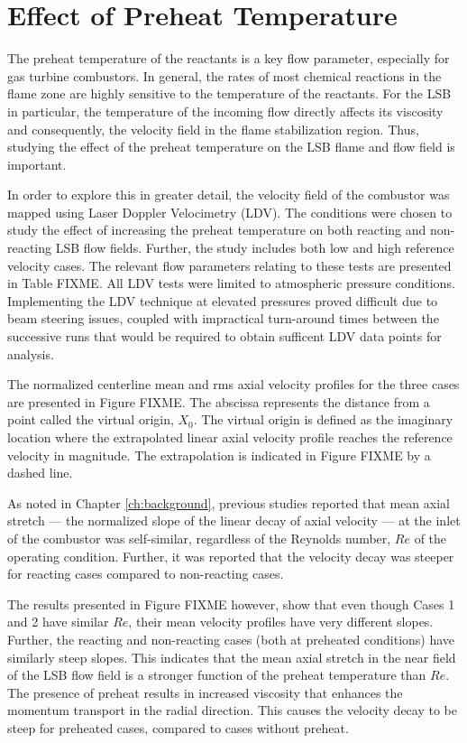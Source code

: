 \section{Effect of Preheat Temperature}
\label{sec:lsb-effect-of-preheat-temperature}

The preheat temperature of the reactants is a key flow parameter, especially for gas turbine combustors.
In general, the rates of most chemical reactions in the flame zone are highly sensitive to the temperature of the reactants.
For the LSB in particular, the temperature of the incoming flow directly affects its viscosity and consequently, the velocity field in the flame stabilization region.
Thus, studying the effect of the preheat temperature on the LSB flame and flow field is important.

In order to explore this in greater detail, the velocity field of the combustor was mapped using Laser Doppler Velocimetry (LDV).
The conditions were chosen to study the effect of increasing the preheat temperature on both reacting and non-reacting LSB flow fields.
Further, the study includes both low and high reference velocity cases.
The relevant flow parameters relating to these tests are presented in Table FIXME.
All LDV tests were limited to atmospheric pressure conditions.
Implementing the LDV technique at elevated pressures proved difficult due to beam steering issues, coupled with impractical turn-around times between the successive runs that would be required to obtain sufficent LDV data points for analysis.

The normalized centerline mean and rms axial velocity profiles for the three cases are presented in Figure FIXME.
The abscissa represents the distance from a point called the virtual origin, \(X_0\).
The virtual origin is defined as the imaginary location where the extrapolated linear axial velocity profile reaches the reference velocity in magnitude.
The extrapolation is indicated in Figure FIXME by a dashed line.

As noted in Chapter \ref{ch:background}, previous studies\cite{2008-cheng-a} reported that mean axial stretch --- the normalized slope of the linear decay of axial velocity --- at the inlet of the combustor was self-similar, regardless of the Reynolds number, \(Re\) of the operating condition.
Further, it was reported that the velocity decay was steeper for reacting cases compared to non-reacting cases.

The results presented in Figure FIXME however, show that even though Cases 1 and 2 have similar \(Re\), their mean velocity profiles have very different slopes.
Further, the reacting and non-reacting cases (both at preheated conditions) have similarly steep slopes.
This indicates that the mean axial stretch in the near field of the LSB flow field is a stronger function of the preheat temperature than \(Re\).
The presence of preheat results in increased viscosity that enhances the momentum transport in the radial direction.
This causes the velocity decay to be steep for preheated cases, compared to cases without preheat.

